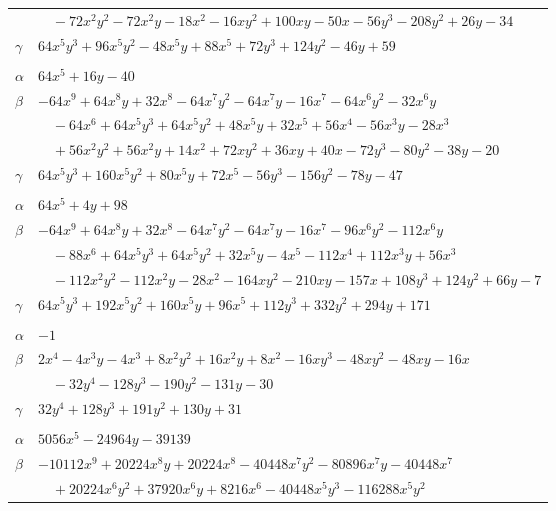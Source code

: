 \documentclass[11pt]{article}
\begin{document}
\begin{longtable}{@{}ll@{}}
 & $\quad -72x^{2}y^{2}-72x^{2}y-18x^{2}-16xy^{2}+100xy-50x-56y^{3}-208y^{2}+26y-34$\\
$\gamma$ & $64x^{5}y^{3}+96x^{5}y^{2}-48x^{5}y+88x^{5}+72y^{3}+124y^{2}-46y+59$\\
\addlinespace[3pt]
\multicolumn{2}{@{}l}{$\{i,j\}=\{10,37\}$, $k_{ij}=2^{2}\cdot 5$}\\
$\alpha$ & $64x^{5}+16y-40$\\
$\beta$ & $-64x^{9}+64x^{8}y+32x^{8}-64x^{7}y^{2}-64x^{7}y-16x^{7}-64x^{6}y^{2}-32x^{6}y$\\
 & $\quad -64x^{6}+64x^{5}y^{3}+64x^{5}y^{2}+48x^{5}y+32x^{5}+56x^{4}-56x^{3}y-28x^{3}$\\
 & $\quad +56x^{2}y^{2}+56x^{2}y+14x^{2}+72xy^{2}+36xy+40x-72y^{3}-80y^{2}-38y-20$\\
$\gamma$ & $64x^{5}y^{3}+160x^{5}y^{2}+80x^{5}y+72x^{5}-56y^{3}-156y^{2}-78y-47$\\
\addlinespace[3pt]
\multicolumn{2}{@{}l}{$\{i,j\}=\{10,39\}$, $k_{ij}=2\cdot 3\cdot 11$}\\
$\alpha$ & $64x^{5}+4y+98$\\
$\beta$ & $-64x^{9}+64x^{8}y+32x^{8}-64x^{7}y^{2}-64x^{7}y-16x^{7}-96x^{6}y^{2}-112x^{6}y$\\
 & $\quad -88x^{6}+64x^{5}y^{3}+64x^{5}y^{2}+32x^{5}y-4x^{5}-112x^{4}+112x^{3}y+56x^{3}$\\
 & $\quad -112x^{2}y^{2}-112x^{2}y-28x^{2}-164xy^{2}-210xy-157x+108y^{3}+124y^{2}+66y-7$\\
$\gamma$ & $64x^{5}y^{3}+192x^{5}y^{2}+160x^{5}y+96x^{5}+112y^{3}+332y^{2}+294y+171$\\
\addlinespace[3pt]
\multicolumn{2}{@{}l}{$\{i,j\}=\{11,13\}$, $k_{ij}=3$}\\
$\alpha$ & $-1$\\
$\beta$ & $2x^{4}-4x^{3}y-4x^{3}+8x^{2}y^{2}+16x^{2}y+8x^{2}-16xy^{3}-48xy^{2}-48xy-16x$\\
 & $\quad -32y^{4}-128y^{3}-190y^{2}-131y-30$\\
$\gamma$ & $32y^{4}+128y^{3}+191y^{2}+130y+31$\\
\addlinespace[3pt]
\multicolumn{2}{@{}l}{$\{i,j\}=\{11,29\}$, $k_{ij}=3^{5}\cdot 5^{2}\cdot 7$}\\
$\alpha$ & $5056x^{5}-24964y-39139$\\
$\beta$ & $-10112x^{9}+20224x^{8}y+20224x^{8}-40448x^{7}y^{2}-80896x^{7}y-40448x^{7}$\\
 & $\quad +20224x^{6}y^{2}+37920x^{6}y+8216x^{6}-40448x^{5}y^{3}-116288x^{5}y^{2}$\\

\end{longtable}
\end{document}
